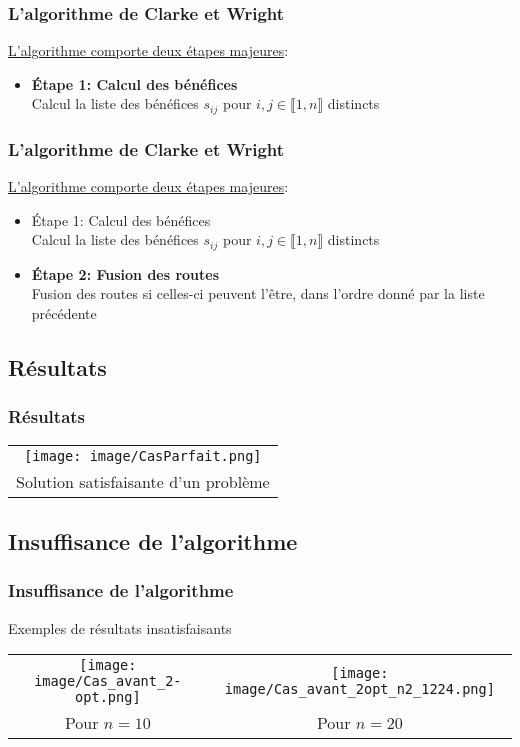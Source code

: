 \documentclass[10pt]{beamer}
\begin{document}
   \begin{frame}
	\frametitle{L'algorithme de Clarke et Wright}
		\underline{L'algorithme comporte deux étapes majeures}:
		\begin{itemize}[label=—]
			\item \textbf{Étape 1: Calcul des bénéfices}
			\  \\ Calcul la liste des bénéfices \(s_{ij}\) pour \(i,j \in \llbracket 1,n \rrbracket \) distincts
		\end{itemize}
	\end{frame}

	\begin{frame}
		\frametitle{L'algorithme de Clarke et Wright}
		\underline{L'algorithme comporte deux étapes majeures}:
		\begin{itemize}[label=—]
			\item Étape 1: Calcul des bénéfices
			\  \\ Calcul la liste des bénéfices \(s_{ij}\) pour \(i,j \in \llbracket 1,n \rrbracket \) distincts
			\item \textbf{Étape 2: Fusion des routes}
			\  \\ Fusion des routes si celles-ci peuvent l'être, dans l'ordre donné par la liste précédente
		\end{itemize}
	\end{frame}

	\subsection{Résultats}

	\begin{frame}
		\frametitle{Résultats}
		\begin{center}
			\begin{tabular}{c}
				\texttt{[image: image/CasParfait.png]}
				\\
				Solution satisfaisante d'un problème
			\end{tabular}
		\end{center}
	\end{frame}

	\subsection{Insuffisance de l'algorithme}
	   
	\begin{frame}
		\frametitle{Insuffisance de l'algorithme}
		\begin{center}
			Exemples de résultats insatisfaisants
			\begin{tabular}{c c}
				\texttt{[image: image/Cas\_avant\_2-opt.png]} & \texttt{[image: image/Cas\_avant\_2opt\_n2\_1224.png]}
				\\
				Pour \(n = 10 \) & Pour \(n = 20 \)
			\end{tabular}
		\end{center}
	\end{frame}
\end{document}
